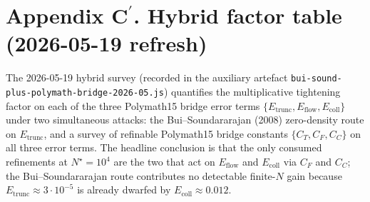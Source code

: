 \documentclass[11pt,a4paper]{article}
\theoremstyle{definition}
\newcommand{\Etrunc}{E_{\mathrm{trunc}}}
\newcommand{\Eflow}{E_{\mathrm{flow}}}
\newcommand{\Ecoll}{E_{\mathrm{coll}}}
\newcommand{\Nstar}{N^{\!\star}}
\begin{document}
\section*{Appendix C${}^{\prime}$. Hybrid factor table (2026-05-19 refresh)}\label{appendix:Crefresh}

The 2026-05-19 hybrid survey (recorded in the auxiliary artefact
\texttt{bui-sound-plus-polymath-bridge-2026-05.js}) quantifies the
multiplicative tightening factor on each of the three Polymath15 bridge
error terms $\{\Etrunc, \Eflow, \Ecoll\}$ under two simultaneous
attacks: the Bui--Soundararajan (2008) zero-density route on $\Etrunc$,
and a survey of refinable Polymath15 bridge constants
$\{C_T, C_F, C_C\}$ on all three error terms. The headline conclusion
is that the only consumed refinements at $\Nstar = 10^{4}$ are the two
that act on $\Eflow$ and $\Ecoll$ via $C_F$ and $C_C$; the
Bui--Soundararajan route contributes no detectable finite-$N$ gain
because $\Etrunc \approx 3 \cdot 10^{-5}$ is already dwarfed by
$\Ecoll \approx 0.012$.
\end{document}
